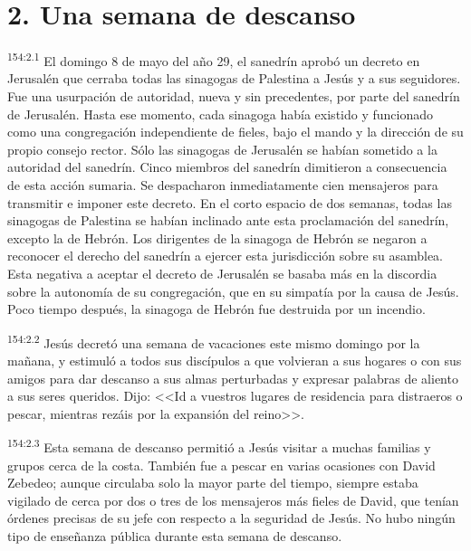 \section*{2. Una semana de descanso}
\par 
\textsuperscript{154:2.1} El domingo 8 de mayo del año 29, el sanedrín aprobó un decreto en Jerusalén que cerraba todas las sinagogas de Palestina a Jesús y a sus seguidores. Fue una usurpación de autoridad, nueva y sin precedentes, por parte del sanedrín de Jerusalén. Hasta ese momento, cada sinagoga había existido y funcionado como una congregación independiente de fieles, bajo el mando y la dirección de su propio consejo rector. Sólo las sinagogas de Jerusalén se habían sometido a la autoridad del sanedrín. Cinco miembros del sanedrín dimitieron a consecuencia de esta acción sumaria. Se despacharon inmediatamente cien mensajeros para transmitir e imponer este decreto. En el corto espacio de dos semanas, todas las sinagogas de Palestina se habían inclinado ante esta proclamación del sanedrín, excepto la de Hebrón. Los dirigentes de la sinagoga de Hebrón se negaron a reconocer el derecho del sanedrín a ejercer esta jurisdicción sobre su asamblea. Esta negativa a aceptar el decreto de Jerusalén se basaba más en la discordia sobre la autonomía de su congregación, que en su simpatía por la causa de Jesús. Poco tiempo después, la sinagoga de Hebrón fue destruida por un incendio.

\par 
\textsuperscript{154:2.2} Jesús decretó una semana de vacaciones este mismo domingo por la mañana, y estimuló a todos sus discípulos a que volvieran a sus hogares o con sus amigos para dar descanso a sus almas perturbadas y expresar palabras de aliento a sus seres queridos. Dijo: <<Id a vuestros lugares de residencia para distraeros o pescar, mientras rezáis por la expansión del reino>>.

\par 
\textsuperscript{154:2.3} Esta semana de descanso permitió a Jesús visitar a muchas familias y grupos cerca de la costa. También fue a pescar en varias ocasiones con David Zebedeo; aunque circulaba solo la mayor parte del tiempo, siempre estaba vigilado de cerca por dos o tres de los mensajeros más fieles de David, que tenían órdenes precisas de su jefe con respecto a la seguridad de Jesús. No hubo ningún tipo de enseñanza pública durante esta semana de descanso.

